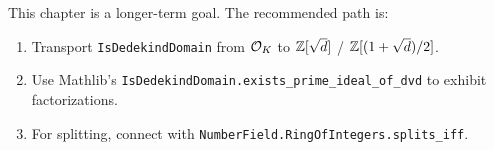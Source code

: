 \begin{remark}
  This chapter is a longer-term goal.  The recommended path is:
  \begin{enumerate}
    \item Transport \texttt{IsDedekindDomain} from
      $\mathcal{O}_K$ to $\mathbb{Z}[\sqrt{d}]$ / $\mathbb{Z}[(1+\sqrt{d})/2]$.
    \item Use Mathlib's
      \texttt{IsDedekindDomain.exists\_prime\_ideal\_of\_dvd}
      to exhibit factorizations.
    \item For splitting, connect with
      \texttt{NumberField.RingOfIntegers.splits\_iff}.
  \end{enumerate}
\end{remark}
